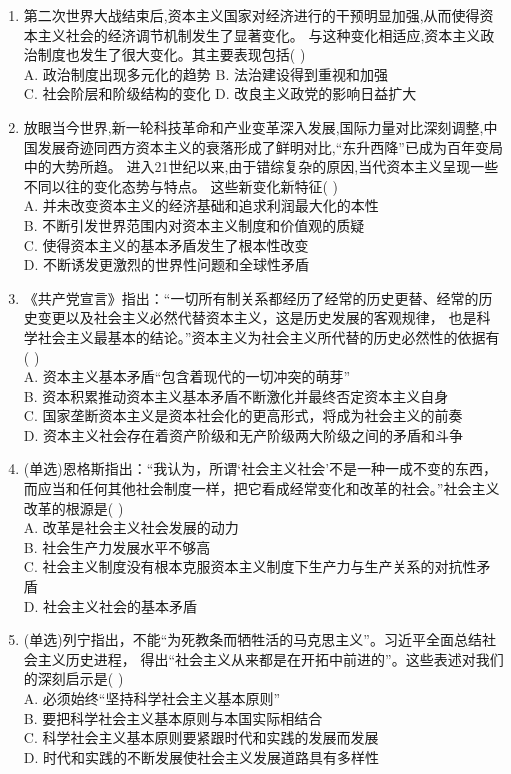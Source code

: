 \documentclass[12pt, a4paper, oneside, UTF8]{ctexbook}
\begin{document}
\begin{enumerate}
    \item 第二次世界大战结束后,资本主义国家对经济进行的干预明显加强,从而使得资本主义社会的经济调节机制发生了显著变化。
    与这种变化相适应,资本主义政治制度也发生了很大变化。其主要表现包括(   ) \\
    A. 政治制度出现多元化的趋势 \qquad
    B. 法治建设得到重视和加强 \\
    C. 社会阶层和阶级结构的变化 \qquad
    D. 改良主义政党的影响日益扩大

    \item 放眼当今世界,新一轮科技革命和产业变革深入发展,国际力量对比深刻调整,中国发展奇迹同西方资本主义的衰落形成了鲜明对比,“东升西降”已成为百年变局中的大势所趋。
    进入21世纪以来,由于错综复杂的原因,当代资本主义呈现一些不同以往的变化态势与特点。
    这些新变化新特征(   ) \\
    A. 并未改变资本主义的经济基础和追求利润最大化的本性\\
    B. 不断引发世界范围内对资本主义制度和价值观的质疑\\
    C. 使得资本主义的基本矛盾发生了根本性改变\\
    D. 不断诱发更激烈的世界性问题和全球性矛盾

    \item 《共产党宣言》指出：“一切所有制关系都经历了经常的历史更替、经常的历史变更以及社会主义必然代替资本主义，这是历史发展的客观规律，
    也是科学社会主义最基本的结论。”资本主义为社会主义所代替的历史必然性的依据有(   ) \\
    A. 资本主义基本矛盾“包含着现代的一切冲突的萌芽” \\
    B. 资本积累推动资本主义基本矛盾不断激化并最终否定资本主义自身 \\
    C. 国家垄断资本主义是资本社会化的更高形式，将成为社会主义的前奏 \\
    D. 资本主义社会存在着资产阶级和无产阶级两大阶级之间的矛盾和斗争

    \item (单选)恩格斯指出：“我认为，所谓‘社会主义社会’不是一种一成不变的东西，
    而应当和任何其他社会制度一样，把它看成经常变化和改革的社会。”社会主义改革的根源是(   ) \\
    A. 改革是社会主义社会发展的动力 \\
    B. 社会生产力发展水平不够高 \\
    C. 社会主义制度没有根本克服资本主义制度下生产力与生产关系的对抗性矛盾 \\
    D. 社会主义社会的基本矛盾 

    \item (单选)列宁指出，不能“为死教条而牺牲活的马克思主义”。习近平全面总结社会主义历史进程，
    得出“社会主义从来都是在开拓中前进的”。这些表述对我们的深刻启示是(   ) \\
    A. 必须始终“坚持科学社会主义基本原则” \\
    B. 要把科学社会主义基本原则与本国实际相结合 \\
    C. 科学社会主义基本原则要紧跟时代和实践的发展而发展 \\
    D. 时代和实践的不断发展使社会主义发展道路具有多样性


\end{enumerate}
\end{document}
